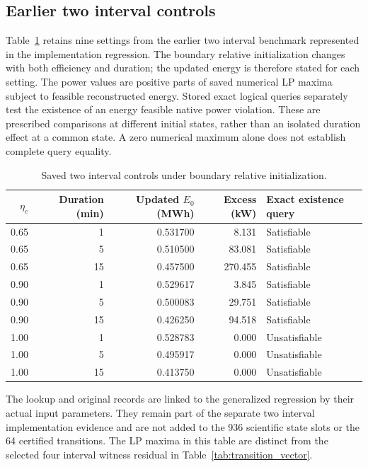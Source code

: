 \subsection{Earlier two interval controls}
Table~\ref{tab:t2_controls} retains nine settings from the earlier two interval
benchmark represented in the implementation regression. The boundary relative
initialization changes with both efficiency and duration; the updated energy
is therefore stated for each setting. The power values are positive parts of
saved numerical LP maxima subject to feasible reconstructed energy. Stored
exact logical queries separately test the existence of an energy feasible
native power violation. These are prescribed comparisons at different initial
states, rather than an isolated duration effect at a common state. A zero
numerical maximum alone does not establish complete query equality.

\begin{table}[H]
\caption{Saved two interval controls under boundary relative initialization.}
\label{tab:t2_controls}
\begin{tabular}{@{}rrrrl@{}}\toprule
$\eta_c$ & Duration (min) & Updated $E_0$ (MWh) & Excess (kW) & Exact existence query\\\midrule
0.65 & 1 & 0.531700 & 8.131 & Satisfiable\\
0.65 & 5 & 0.510500 & 83.081 & Satisfiable\\
0.65 & 15 & 0.457500 & 270.455 & Satisfiable\\
0.90 & 1 & 0.529617 & 3.845 & Satisfiable\\
0.90 & 5 & 0.500083 & 29.751 & Satisfiable\\
0.90 & 15 & 0.426250 & 94.518 & Satisfiable\\
1.00 & 1 & 0.528783 & 0.000 & Unsatisfiable\\
1.00 & 5 & 0.495917 & 0.000 & Unsatisfiable\\
1.00 & 15 & 0.413750 & 0.000 & Unsatisfiable\\
\bottomrule\end{tabular}
\end{table}

The lookup and original records are linked to the generalized regression by
their actual input parameters. They remain part of the separate two interval
implementation evidence and are not added to the 936 scientific state slots
or the 64 certified transitions. The LP maxima in this table are distinct
from the selected four interval witness residual in Table~\ref{tab:transition_vector}.


